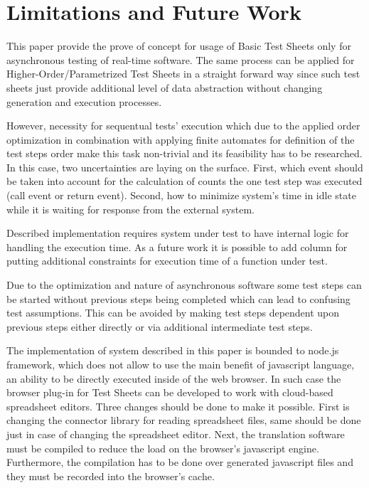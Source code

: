 

\chapter{Limitations and Future Work}
\label{chap:limits}
This paper provide the  prove of concept for usage of Basic Test Sheets only for asynchronous testing of real-time software. The same process can be applied for Higher-Order/Parametrized Test Sheets in a straight forward way since such test sheets just provide additional level of data abstraction without changing generation and execution processes.

However, necessity for sequentual tests' execution which due to the applied order optimization in combination with applying finite automates for definition of the test steps order make this task non-trivial and its feasibility has to be researched.
In this case, two uncertainties are laying on the surface. First, which event should be taken into account for the calculation of counts the one test step was executed (call event or return event). Second, how to minimize system's time in idle state while it is waiting for response from the external system.

Described implementation requires system under test to have internal logic for handling the execution time. As a future work it is possible to add column for putting additional constraints for execution time of a function under test.

Due to the optimization and nature of asynchronous software some test steps can be started without previous steps being completed which can lead to confusing test assumptions. This can be avoided by making test steps dependent upon previous steps either directly or via additional intermediate test steps.

The implementation  of system described in this paper is bounded to node.js framework, which does not allow to use the  main benefit of javascript language, an ability to be directly executed inside of the web browser. In such case the browser plug-in for Test Sheets can be developed to work with cloud-based spreadsheet editors. Three changes should be done to make it possible. First is changing the connector library for reading spreadsheet files, same should be done just in case of changing the spreadsheet editor. Next, the  translation software must be compiled to reduce the load on the browser's javascript engine. Furthermore, the compilation has to be done over generated javascript files and they must be recorded into the browser's cache.

